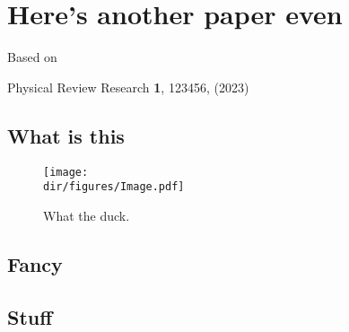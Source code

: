 \chapter{Here's another paper even}
\label{ch:chapter-4}


\centerline{Based on}
\centerline{Physical Review Research \textbf{1}, 123456, (2023) \cite{Name:2024}}
\vspace{1em}

\lipsum[1-2
]
\section{What is this}

\lipsum[1-3]
\begin{figure}[t]
	\centering
	\texttt{[image: \\dir/figures/Image.pdf]}
	\caption{What the duck.}
	\label{fig:Duck4}
\end{figure}

\section{Fancy}

\lipsum[3-4]


\section{Stuff}

\lipsum[5-9]
